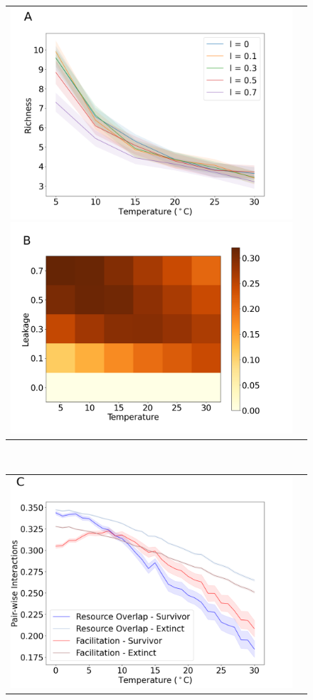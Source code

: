 \begin{figure}
    \centering
    \begin{tabular}{c@{}c@{}}
    \includegraphics[scale=0.27]{./Figures/leakage_rich.png}
    \includegraphics[scale=0.27]{./Figures/cf_lf.png}
    \end{tabular}
    \hfill\\
    \begin{tabular}{c@{}c@{}}
    \includegraphics[scale=0.27]{./Figures/07.png}

\end{tabular}
\end{figure}
